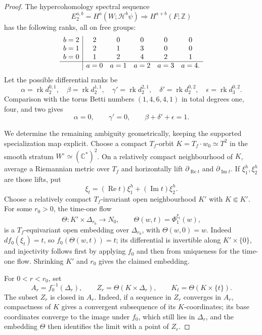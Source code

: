 \begin{proof}
The hypercohomology spectral sequence
\[
 E_2^{a,b}=H^a(W;\mathcal H^b\psi)
 \Longrightarrow H^{a+b}(F;\mathbb Z)
\tag{IL.5.8}
\]
has the following ranks, all on free groups:
\[
\begin{array}{c|ccccc}
b=2&2&0&0&0&0\\
b=1&2&1&3&0&0\\
b=0&1&2&4&2&1\\ \hline
&a=0&a=1&a=2&a=3&a=4.
\end{array}
\]
Let the possible differential ranks be
\[
\alpha=\operatorname{rk}d_2^{0,1},\quad
\beta=\operatorname{rk}d_2^{1,1},\quad
\gamma'=\operatorname{rk}d_2^{2,1},\quad
\delta'=\operatorname{rk}d_2^{0,2},\quad
\epsilon=\operatorname{rk}d_3^{0,2}.
\]
Comparison with the torus Betti numbers \((1,4,6,4,1)\) in total degrees
one, four, and two gives
\[
 \alpha=0,\qquad \gamma'=0,\qquad
 \beta+\delta'+\epsilon=1.
\tag{IL.5.9}
\]

We determine the remaining ambiguity geometrically, keeping the supported
specialization map explicit.  Choose a compact \(T_f\)-orbit
\(K=T_f\cdot w_0\simeq T^2\) in the smooth stratum
\(W^\circ\simeq(\mathbb C^*)^2\).  On a relatively compact neighbourhood
of \(K\), average a Riemannian metric over \(T_f\) and horizontally lift
\(\partial_{\operatorname{Re}t}\) and
\(\partial_{\operatorname{Im}t}\).  If \(\xi_1^h,\xi_2^h\) are those lifts,
put
\[
 \xi_t=(\operatorname{Re}t)\xi_1^h+
       (\operatorname{Im}t)\xi_2^h.
\]
Choose a relatively compact \(T_f\)-invariant open neighbourhood \(K'\)
with \(K\Subset K'\).  For some \(r_0>0\), the time-one flow
\[
 \Theta:K'\times\Delta_{r_0}\longrightarrow N_0,
 \qquad \Theta(w,t)=\Phi^{\xi_t}_1(w),
\tag{IL.5.9a}
\]
is a \(T_f\)-equivariant open embedding over \(\Delta_{r_0}\), with
\(\Theta(w,0)=w\).  Indeed \(df_0(\xi_t)=t\), so
\(f_0(\Theta(w,t))=t\); its differential is invertible along
\(K'\times\{0\}\), and injectivity follows first by applying \(f_0\) and
then from uniqueness for the time-one flow.  Shrinking \(K'\) and \(r_0\)
gives the claimed embedding.

For \(0<r<r_0\), set
\[
 A_r=f_0^{-1}(\Delta_r),\qquad
 Z_r=\Theta(K\times\Delta_r),\qquad
 K_t=\Theta(K\times\{t\}).
\]
The subset \(Z_r\) is closed in \(A_r\).  Indeed, if a sequence in \(Z_r\)
converges in \(A_r\), compactness of \(K\) gives a convergent subsequence of
its \(K\)-coordinates; its base coordinates converge to the image under
\(f_0\), which still lies in \(\Delta_r\), and the embedding \(\Theta\)
then identifies the limit with a point of \(Z_r\).


\end{proof}
